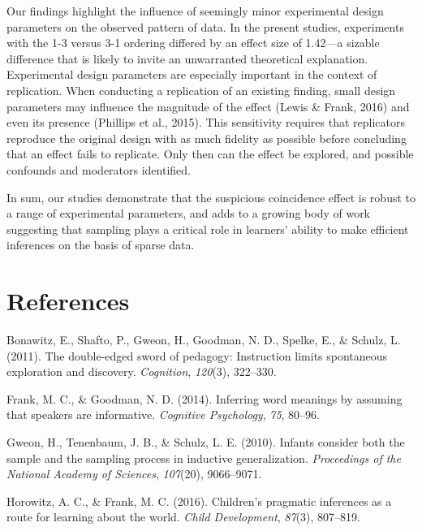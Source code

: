 \documentclass[english,floatsintext,man]{apa6}
\theoremstyle{definition}
\theoremstyle{definition}
\theoremstyle{definition}
\theoremstyle{remark}
\begin{document}
Our findings highlight the influence of seemingly minor experimental
design parameters on the observed pattern of data. In the present
studies, experiments with the 1-3 versus 3-1 ordering differed by an
effect size of 1.42---a sizable difference that is likely to invite an
unwarranted theoretical explanation. Experimental design parameters are
especially important in the context of replication. When conducting a
replication of an existing finding, small design parameters may
influence the magnitude of the effect (Lewis \& Frank, 2016) and even
its presence (Phillips et al., 2015). This sensitivity requires that
replicators reproduce the original design with as much fidelity as
possible before concluding that an effect fails to replicate. Only then
can the effect be explored, and possible confounds and moderators
identified.

In sum, our studies demonstrate that the suspicious coincidence effect
is robust to a range of experimental parameters, and adds to a growing
body of work suggesting that sampling plays a critical role in learners'
ability to make efficient inferences on the basis of sparse data.

\newpage

\section{References}\label{references}

\setlength{\parindent}{-0.5in} \setlength{\leftskip}{0.5in}

\hypertarget{refs}{}
\hypertarget{ref-bonawitz2011}{}
Bonawitz, E., Shafto, P., Gweon, H., Goodman, N. D., Spelke, E., \&
Schulz, L. (2011). The double-edged sword of pedagogy: Instruction
limits spontaneous exploration and discovery. \emph{Cognition},
\emph{120}(3), 322--330.

\hypertarget{ref-frank2014}{}
Frank, M. C., \& Goodman, N. D. (2014). Inferring word meanings by
assuming that speakers are informative. \emph{Cognitive Psychology},
\emph{75}, 80--96.

\hypertarget{ref-gweon2010}{}
Gweon, H., Tenenbaum, J. B., \& Schulz, L. E. (2010). Infants consider
both the sample and the sampling process in inductive generalization.
\emph{Proceedings of the National Academy of Sciences}, \emph{107}(20),
9066--9071.

\hypertarget{ref-horowitz2016}{}
Horowitz, A. C., \& Frank, M. C. (2016). Children's pragmatic inferences
as a route for learning about the world. \emph{Child Development},
\emph{87}(3), 807--819.
\end{document}
